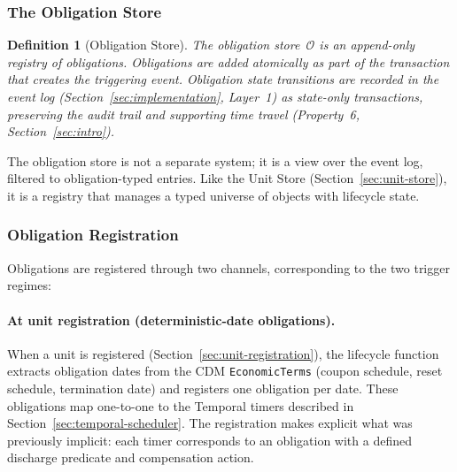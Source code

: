 \documentclass[11pt,a4paper]{article}
\newtheorem{definition}{Definition}[section]
\begin{document}
\subsubsection{The Obligation Store}
\label{sec:obligation-store}

\begin{definition}[Obligation Store]
\label{def:obligation-store}
The \emph{obligation store}~$\mathcal{O}$ is an append-only registry of obligations. Obligations are added atomically as part of the transaction that creates the triggering event. Obligation state transitions are recorded in the event log (Section~\ref{sec:implementation}, Layer~1) as state-only transactions, preserving the audit trail and supporting time travel (Property~6, Section~\ref{sec:intro}).
\end{definition}

\noindent The obligation store is not a separate system; it is a view over the event log, filtered to obligation-typed entries. Like the Unit Store (Section~\ref{sec:unit-store}), it is a registry that manages a typed universe of objects with lifecycle state.

\subsubsection{Obligation Registration}
\label{sec:obligation-registration}

Obligations are registered through two channels, corresponding to the two trigger regimes:

\paragraph{At unit registration (deterministic-date obligations).}
When a unit is registered (Section~\ref{sec:unit-registration}), the lifecycle function extracts obligation dates from the CDM \texttt{EconomicTerms} (coupon schedule, reset schedule, termination date) and registers one obligation per date. These obligations map one-to-one to the Temporal timers described in Section~\ref{sec:temporal-scheduler}. The registration makes explicit what was previously implicit: each timer corresponds to an obligation with a defined discharge predicate and compensation action.
\end{document}

